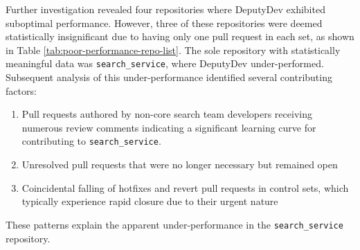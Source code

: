 Further investigation revealed four repositories where DeputyDev exhibited suboptimal performance. However, three of these repositories were deemed statistically insignificant due to having only one pull request in each set, as shown in Table \ref{tab:poor-performance-repo-list}. The sole repository with statistically meaningful data was \texttt{search\_service}, where DeputyDev under-performed. Subsequent analysis of this under-performance identified several contributing factors:

\begin{enumerate}
    \item Pull requests authored by non-core search team developers receiving numerous review comments indicating a significant learning curve for contributing to \texttt{search\_service}.
    \item Unresolved pull requests that were no longer necessary but remained open
    \item Coincidental falling of hotfixes and revert pull requests in control sets, which typically experience rapid closure due to their urgent nature
\end{enumerate}

These patterns explain the apparent under-performance in the \texttt{search\_service} repository.